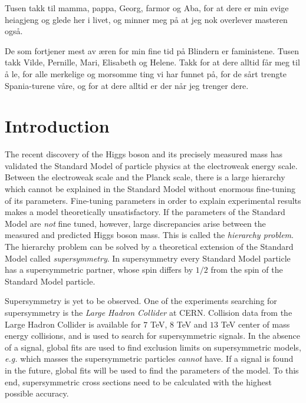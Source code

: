 \documentclass[twoside,english]{uiofysmaster}
\begin{document}
Tusen takk til mamma, pappa, Georg, farmor og Aba, for at dere er min evige heiagjeng og glede her i livet, og minner meg p{\aa} at jeg nok overlever masteren ogs{\aa}. 

De som fortjener mest av {\ae}ren for min fine tid p{\aa} Blindern er faministene. Tusen takk Vilde, Pernille, Mari, Elisabeth og Helene. Takk for at dere alltid f{\aa}r meg til {\aa} le, for alle merkelige og morsomme ting vi har funnet p{\aa}, for de s{\aa}rt trengte Spania-turene v{\aa}re, og for at dere alltid er der n{\aa}r jeg trenger dere. 





\tableofcontents

\chapter*{Introduction}

The recent discovery of the Higgs boson \cite{20121, 201230} and its precisely measured mass has validated the Standard Model of particle physics at the electroweak energy scale. Between the electroweak scale and the Planck scale, there is a large hierarchy which cannot be explained in the Standard Model without enormous fine-tuning of its parameters. Fine-tuning parameters in order to explain experimental results makes a model theoretically unsatisfactory. If the parameters of the Standard Model are \textit{not} fine tuned, however, large discrepancies arise between the measured and predicted Higgs boson mass. This is called the \textit{hierarchy problem}. The hierarchy problem can be solved by a theoretical extension of the Standard Model called \textit{supersymmetry}. In supersymmetry every Standard Model particle has a supersymmetric partner, whose spin differs by $1/2$ from the spin of the Standard Model particle. 

Supersymmetry is yet to be observed. One of the experiments searching for supersymmetry is the \textit{Large Hadron Collider} at CERN. Collision data from the Large Hadron Collider is available for $7$ TeV, $8$ TeV and $13$ TeV center of mass energy collisions, and is used to search for supersymmetric signals. In the absence of a signal, global fits are used to find exclusion limits on supersymmetric models, \textit{e.g.} which masses the supersymmetric particles \textit{cannot} have. If a signal is found in the future, global fits will be used to find the parameters of the model. To this end, supersymmetric cross sections need to be calculated with the highest possible accuracy.
\end{document}
